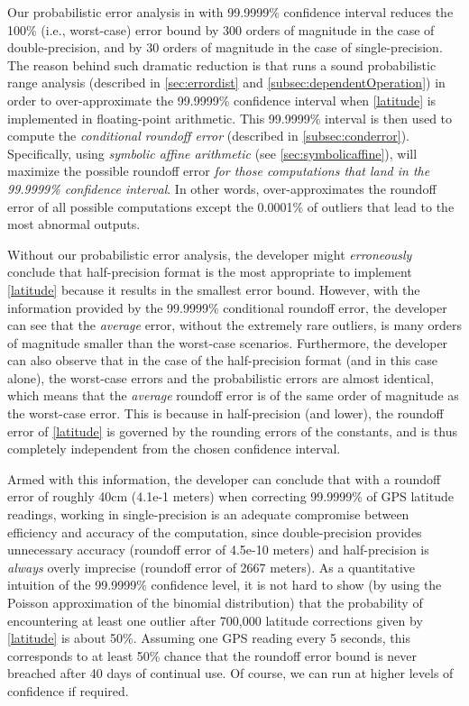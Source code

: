 Our probabilistic error analysis in \Tool with 99.9999\% confidence interval reduces the 100\% (i.e., worst-case) error bound by 300 orders of magnitude in the case of double-precision, and by 30 orders of magnitude in the case of single-precision.
%
The reason behind such dramatic reduction is that \Tool runs a sound probabilistic range analysis (described in \cref{sec:errordist} and \cref{subsec:dependentOperation}) in order to over-approximate the 99.9999\% confidence interval when \eqref{latitude} is implemented in floating-point arithmetic. This 99.9999\% interval is then used  to compute the \emph{conditional roundoff error} (described in \cref{subsec:conderror}).
%
Specifically, using \emph{symbolic affine arithmetic} (see \cref{sec:symbolicaffine}), \Tool will maximize the possible roundoff error \emph{for those computations that land in the 99.9999\% confidence interval}.
%
In other words, \Tool over-approximates the roundoff error of all possible computations except the 0.0001\% of outliers that lead to the most abnormal outputs.
%

Without our probabilistic error analysis, the developer might \emph{erroneously} conclude that half-precision format is the most appropriate to implement \eqref{latitude} because it results in the smallest error bound.
%
However, with the information provided by the 99.9999\% conditional roundoff error, the developer can see that the \emph{average} error, without the extremely rare outliers, is many orders of magnitude smaller than the worst-case scenarios.
%
Furthermore, the developer can also observe that in the case of the half-precision format (and in this case alone), the worst-case errors and the probabilistic errors are almost identical,  which means that the \emph{average} roundoff error is of the same order of magnitude as the worst-case error.
%
This is because in half-precision (and lower), the roundoff error of \eqref{latitude} is governed by the rounding errors of the constants,  and is thus completely independent from the chosen confidence interval.

Armed with this information, the developer can conclude that with a roundoff error of roughly 40cm (4.1e-1 meters) when correcting 99.9999\% of GPS latitude readings, working in single-precision is an adequate compromise between efficiency and accuracy of the computation, since double-precision provides unnecessary accuracy (roundoff error of 4.5e-10 meters) and half-precision is \emph{always} overly imprecise (roundoff error of 2667 meters).  As a quantitative intuition of the 99.9999\% confidence level,  it is not hard to show (by using the Poisson approximation of the binomial distribution) that the probability of encountering at least one outlier after 700,000 latitude corrections given by \eqref{latitude} is about 50\%. Assuming one GPS reading every 5 seconds, this corresponds to at least 50\% chance that the roundoff error bound is never breached after 40 days of continual use.  Of course, we can run \Tool at higher levels of confidence if required.

